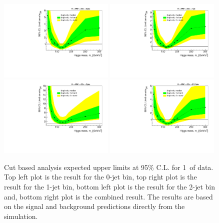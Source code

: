 \begin{figure}[!htbp]
\begin{center}
   \includegraphics[width=0.49\textwidth]{figures/limits_0j_1000pb_cut_1.pdf}
   \includegraphics[width=0.49\textwidth]{figures/limits_1j_1000pb_cut_1.pdf}
   \includegraphics[width=0.49\textwidth]{figures/limits_2j_1000pb_cut_1.pdf}
   \includegraphics[width=0.49\textwidth]{figures/limits_nj_1000pb_cut_1.pdf}
   \caption{Cut based analysis expected upper limits at 95\% C.L. for 1\ifb\ of data. Top left plot 
   is the result for the 0-jet bin, top right plot is the result for the 1-jet bin, bottom left plot 
   is the result for the 2-jet bin and, bottom right plot is the combined result. The results 
   are based on the signal and background predictions directly from the simulation.}
   \label{fig:cutbase_uls}
\end{center}
\end{figure}

